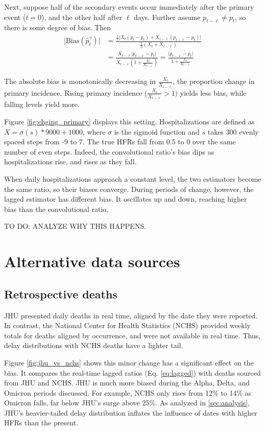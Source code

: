\documentclass{article}
\begin{document}
Next, suppose half of the secondary events occur immediately after the primary event ($t=0$), and the other half after $\ell$ days. Further assume $p_{t-\ell}\neq p_t$, so there is some degree of bias. Then
\begin{align*}
    \lvert\text{Bias}(\hat{p}_t^{\gamma})\rvert &= \frac{\frac{1}{2}\big\lvert X_{t}(p_t-p_t) + X_{t-\ell}(p_{t-\ell}-p_t)\big\rvert}{\frac{1}{2}(X_{t}+X_{t-\ell})} \\
    &=\frac{X_{t-\ell}\lvert p_{t-\ell}-p_t\rvert}{X_{t-\ell}(1+\frac{X_{t}}{X_{t-\ell}})} = \frac{\lvert p_{t-\ell}-p_t \rvert}{1+\frac{X_{t}}{X_{t-\ell}}}
\end{align*}

The absolute bias is monotonically decreasing in $\frac{X_{t}}{X_{t-\ell}}$, the proportion change in primary incidence. Rising primary incidence ($\frac{X_{t}}{X_{t-\ell}}>1)$ yields less bias, while falling levels yield more.

Figure \ref{fig:chging_primary} displays this setting. Hospitalizations are defined as $X = \sigma(s)*9000+1000$, where $\sigma$ is the sigmoid function and $s$ takes 300 evenly spaced steps from -9 to 7. The true HFRs fall from 0.5 to 0 over the same number of even steps. Indeed, the convolutional ratio's bias dips as hospitalizations rise, and rises as they fall. 

When daily hospitalizations approach a constant level, the two estimators become the same ratio, so their biases converge. During periods of change, however, the lagged estimator has different bias. It oscillates up and down, reaching higher bias than the convolutional ratio. 

TO DO: ANALYZE WHY THIS HAPPENS.

\section{Alternative data sources}
\subsection{Retrospective deaths}\label{apx:NCHS_deaths}

JHU presented daily deaths in real time, aligned by the date they were reported. In contrast, the National Center for Health Statistics (NCHS) provided weekly totals for deaths aligned by occurrence, and were not available in real time. Thus, delay distributions with NCHS deaths have a lighter tail. 

Figure \ref{fig:jhu_vs_nchs} shows this minor change has a significant effect on the bias. It compares the real-time lagged ratios (Eq. \ref{eq:lagged}) with deaths sourced from JHU and NCHS. JHU is much more biased during the Alpha, Delta, and Omicron periods discussed. For example, NCHS only rises from 12\% to 14\% as Omicron falls, far below JHU's surge above 25\%. As analyzed in \ref{sec:analysis}, JHU's heavier-tailed delay distribution inflates the influence of dates with higher HFRs than the present.
\end{document}
